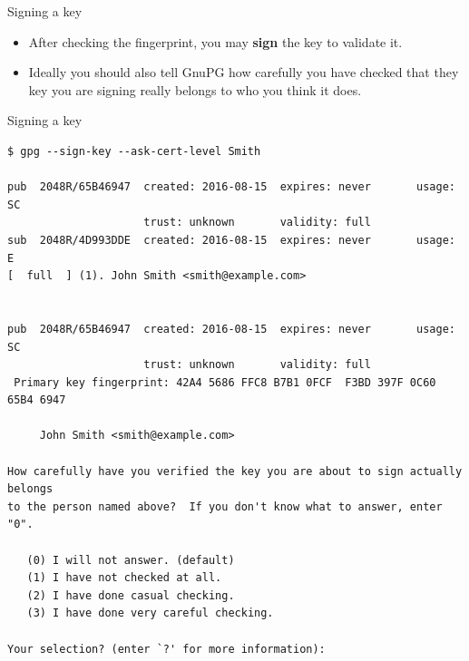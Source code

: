 \documentclass[%
mode=present,%
paper=smartboard,
size=20pt,
]{powerdot}
\begin{document}
\begin{slide}[method=direct]{Signing a key}
  \begin{itemize}
  \item After checking the fingerprint, you may \textbf{sign} the key
    to validate it.
  \item Ideally you should also tell GnuPG how carefully you have
    checked that they key you are signing really belongs to who you
    think it does.
  \end{itemize}
\end{slide}

\makeatletter\renewcommand{\verbatim@font}{\scriptsize\tt}\makeatother
\begin{slide}[method=direct,toc=]{Signing a key}
\begin{verbatim}
$ gpg --sign-key --ask-cert-level Smith

pub  2048R/65B46947  created: 2016-08-15  expires: never       usage: SC  
                     trust: unknown       validity: full
sub  2048R/4D993DDE  created: 2016-08-15  expires: never       usage: E   
[  full  ] (1). John Smith <smith@example.com>


pub  2048R/65B46947  created: 2016-08-15  expires: never       usage: SC  
                     trust: unknown       validity: full
 Primary key fingerprint: 42A4 5686 FFC8 B7B1 0FCF  F3BD 397F 0C60 65B4 6947

     John Smith <smith@example.com>

How carefully have you verified the key you are about to sign actually belongs
to the person named above?  If you don't know what to answer, enter "0".

   (0) I will not answer. (default)
   (1) I have not checked at all.
   (2) I have done casual checking.
   (3) I have done very careful checking.

Your selection? (enter `?' for more information):
\end{verbatim}
\end{slide}
\end{document}

